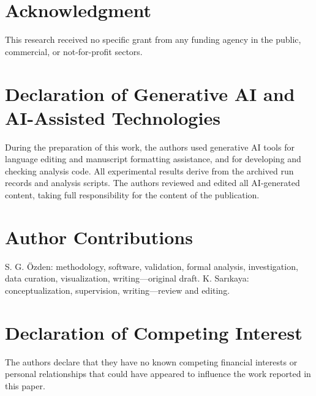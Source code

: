 \documentclass[journal]{IEEEtran}
\begin{document}
\section*{Acknowledgment}
This research received no specific grant from any funding agency in the public, commercial, or not-for-profit sectors.

\section*{Declaration of Generative AI and AI-Assisted Technologies}
During the preparation of this work, the authors used generative AI tools for language editing and manuscript formatting assistance, and for developing and checking analysis code. All experimental results derive from the archived run records and analysis scripts. The authors reviewed and edited all AI-generated content, taking full responsibility for the content of the publication.

\section*{Author Contributions}
S. G. \"Ozden: methodology, software, validation, formal analysis, investigation, data curation, visualization, writing---original draft. K. Sar{\i}kaya: conceptualization, supervision, writing---review and editing.

\section*{Declaration of Competing Interest}
The authors declare that they have no known competing financial interests or personal relationships that could have appeared to influence the work reported in this paper.



\end{document}
